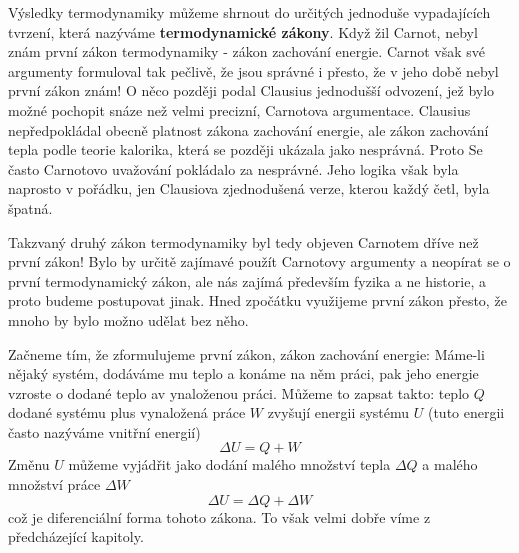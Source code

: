     Výsledky termodynamiky můžeme shrnout do určitých jednoduše vypadajících tvrzení, která nazýváme
    \textbf{termodynamické zákony}. Když žil Carnot, nebyl znám první zákon termodynamiky - zákon
    zachování energie. Carnot však své argumenty formuloval tak pečlivě, že jsou správné i přesto,
    že v jeho době nebyl první zákon znám! O něco později podal Clausius jednodušší odvození, jež
    bylo možné pochopit snáze než velmi precizní, Carnotova argumentace. Clausius nepředpokládal
    obecně platnost zákona zachování energie, ale zákon zachování tepla podle teorie kalorika, která
    se později ukázala jako nesprávná. Proto Se často Carnotovo uvažování pokládalo za nesprávné.
    Jeho logika však byla naprosto v pořádku, jen Clausiova zjednodušená verze, kterou každý četl,
    byla špatná.

    Takzvaný druhý zákon termodynamiky byl tedy objeven Carnotem dříve než první zákon! Bylo by
    určitě zajímavé použít Carnotovy argumenty a neopírat se o první termodynamický zákon, ale nás
    zajímá především fyzika a ne historie, a proto budeme postupovat jinak. Hned zpočátku využijeme
    první zákon přesto, že mnoho by bylo možno udělat bez něho.

    Začneme tím, že zformulujeme první zákon, zákon zachování energie: Máme-li nějaký systém,
    dodáváme mu teplo a konáme na něm práci, pak jeho energie vzroste o dodané teplo av ynaloženou
    práci. Můžeme to zapsat takto: teplo \(Q\) dodané systému plus vynaložená práce \(W\) zvyšují
    energii systému \(U\) (tuto energii často nazýváme vnitřní energií)
    \begin{equation}\label{fyz:eq575}
      \Delta U = Q + W
    \end{equation}
    Změnu \(U\) můžeme vyjádřit jako dodání malého množství tepla \(\Delta Q\) a malého množství
    práce \(\Delta W\)
    \begin{equation}\label{fyz:eq576}
      \Delta U = \Delta Q + \Delta W
    \end{equation}
    což je diferenciální forma tohoto zákona. To však velmi dobře víme z předcházející kapitoly.


